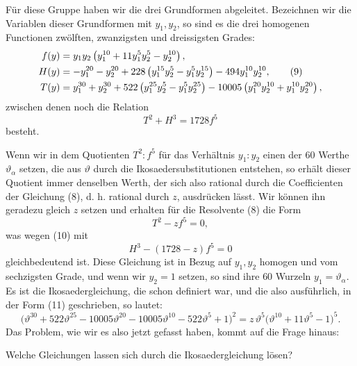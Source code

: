 \documentclass[11pt]{article}
\begin{document}
Für diese Gruppe haben wir die drei Grundformen abgeleitet. Bezeichnen wir die Variablen dieser Grundformen mit \(y_1,y_2\), so sind es die drei homogenen Functionen zwölften, zwanzigsten und dreissigsten Grades:
\begin{align}
f(y)&=y_1y_2\left(y_1^{10}+11y_1^5y_2^5-y_2^{10}\right),\notag\\
H(y)&=-y_1^{20}-y_2^{20}+228\left(y_1^{15}y_2^5-y_1^5y_2^{15}\right)-494y_1^{10}y_2^{10},\tag{9}\\
T(y)&=y_1^{30}+y_2^{30}+522\left(y_1^{25}y_2^5-y_1^5y_2^{25}\right)
-10005\left(y_1^{20}y_2^{10}+y_1^{10}y_2^{20}\right),\notag
\end{align}
zwischen denen noch die Relation
\begin{equation}
T^2+H^3=1728 f^5
\tag{10}
\end{equation}
besteht.

Wenn wir in dem Quotienten \(T^2:f^5\) für das Verhältnis \(y_1:y_2\) einen der \(60\) Werthe \(\vartheta_\alpha\) setzen, die aus \(\vartheta\) durch die Ikosaedersubstitutionen entstehen, so erhält dieser Quotient immer denselben Werth, der sich also rational durch die Coefficienten der Gleichung (8), d. h. rational durch \(z\), ausdrücken lässt. Wir können ihn geradezu gleich \(z\) setzen und erhalten für die Resolvente (8) die Form
\begin{equation}
T^2-zf^5=0,
\tag{11}
\end{equation}
was wegen (10) mit
\[
H^3-(1728-z)f^5=0
\]
gleichbedeutend ist. Diese Gleichung ist in Bezug auf \(y_1,y_2\) homogen und vom sechzigsten Grade, und wenn wir \(y_2=1\) setzen, so sind ihre \(60\) Wurzeln \(y_1=\vartheta_\alpha\). Es ist die Ikosaedergleichung, die schon definiert war, und die also ausführlich, in der Form (11) geschrieben, so lautet:
\[
\bigl(\vartheta^{30}+522\vartheta^{25}-10005\vartheta^{20}
-10005\vartheta^{10}-522\vartheta^5+1\bigr)^2
=
z\,\vartheta^5\bigl(\vartheta^{10}+11\vartheta^5-1\bigr)^5.
\]
Das Problem, wie wir es also jetzt gefasst haben, kommt auf die Frage hinaus:

\begin{center}
Welche Gleichungen lassen sich durch die Ikosaedergleichung lösen?
\end{center}
\end{document}
